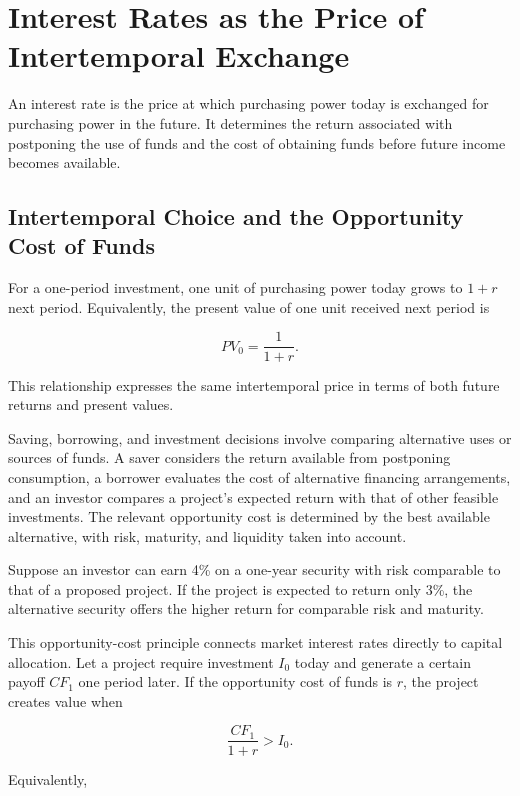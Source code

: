 \section{Interest Rates as the Price of Intertemporal Exchange}

An interest rate is the price at which purchasing power today is exchanged for purchasing power in the future. It determines the return associated with postponing the use of funds and the cost of obtaining funds before future income becomes available.

\subsection{Intertemporal Choice and the Opportunity Cost of Funds}

For a one-period investment, one unit of purchasing power today grows to \(1+r\) next period. Equivalently, the present value of one unit received next period is

\[
PV_0=\frac{1}{1+r}.
\]

This relationship expresses the same intertemporal price in terms of both future returns and present values.

Saving, borrowing, and investment decisions involve comparing alternative uses or sources of funds. A saver considers the return available from postponing consumption, a borrower evaluates the cost of alternative financing arrangements, and an investor compares a project's expected return with that of other feasible investments. The relevant opportunity cost is determined by the best available alternative, with risk, maturity, and liquidity taken into account.

Suppose an investor can earn 4\% on a one-year security with risk comparable to that of a proposed project. If the project is expected to return only 3\%, the alternative security offers the higher return for comparable risk and maturity.

This opportunity-cost principle connects market interest rates directly to capital allocation. Let a project require investment $I_0$ today and generate a certain payoff $CF_1$ one period later. If the opportunity cost of funds is $r$, the project creates value when

\begin{equation*}
\frac{CF_1}{1+r}>I_0.
\label{eq:ch6-one-period-investment-condition}
\end{equation*}

Equivalently,

